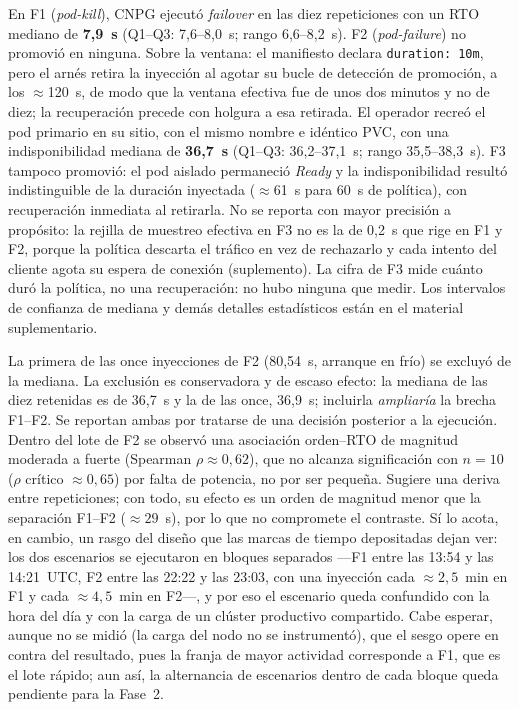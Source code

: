 En F1 (\textit{pod-kill}), CNPG ejecutó \textit{failover} en las diez repeticiones con un RTO mediano de \textbf{7,9~s} (Q1--Q3: 7,6--8,0~s; rango 6,6--8,2~s). F2 (\textit{pod-failure}) no promovió en ninguna. Sobre la ventana: el manifiesto declara \texttt{duration:\ 10m}, pero el arnés retira la inyección al agotar su bucle de detección de promoción, a los $\approx$120~s, de modo que la ventana efectiva fue de unos dos minutos y no de diez; la recuperación precede con holgura a esa retirada. El operador recreó el pod primario en su sitio, con el mismo nombre e idéntico PVC, con una indisponibilidad mediana de \textbf{36,7~s} (Q1--Q3: 36,2--37,1~s; rango 35,5--38,3~s). F3 tampoco promovió: el pod aislado permaneció \textit{Ready} y la indisponibilidad resultó indistinguible de la duración inyectada ($\approx$61~s para 60~s de política), con recuperación inmediata al retirarla. No se reporta con mayor precisión a propósito: la rejilla de muestreo efectiva en F3 no es la de 0,2~s que rige en F1 y F2, porque la política descarta el tráfico en vez de rechazarlo y cada intento del cliente agota su espera de conexión (suplemento). La cifra de F3 mide cuánto duró la política, no una recuperación: no hubo ninguna que medir. Los intervalos de confianza de mediana y demás detalles estadísticos están en el material suplementario.

La primera de las once inyecciones de F2 (80,54~s, arranque en frío) se excluyó de la mediana. La exclusión es conservadora y de escaso efecto: la mediana de las diez retenidas es de 36,7~s y la de las once, 36,9~s; incluirla \emph{ampliaría} la brecha F1--F2. Se reportan ambas por tratarse de una decisión posterior a la ejecución. Dentro del lote de F2 se observó una asociación orden--RTO de magnitud moderada a fuerte (Spearman $\rho\approx 0{,}62$), que no alcanza significación con $n=10$ ($\rho$ crítico $\approx 0{,}65$) por falta de potencia, no por ser pequeña. Sugiere una deriva entre repeticiones; con todo, su efecto es un orden de magnitud menor que la separación F1--F2 ($\approx 29$~s), por lo que no compromete el contraste. Sí lo acota, en cambio, un rasgo del diseño que las marcas de tiempo depositadas dejan ver: los dos escenarios se ejecutaron en bloques separados —F1 entre las 13:54 y las 14:21~UTC, F2 entre las 22:22 y las 23:03, con una inyección cada $\approx 2{,}5$~min en F1 y cada $\approx 4{,}5$~min en F2—, y por eso el escenario queda confundido con la hora del día y con la carga de un clúster productivo compartido. Cabe esperar, aunque no se midió  (la carga del nodo no se instrumentó), que el sesgo opere en contra del resultado, pues la franja de mayor actividad corresponde a F1, que es el lote rápido; aun así, la alternancia de escenarios dentro de cada bloque queda pendiente para la Fase~2.

